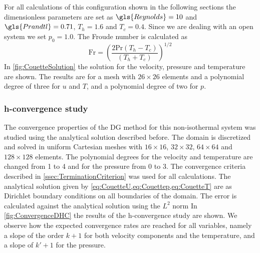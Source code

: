 \FloatBarrier
For all calculations of this configuration shown in the following sections the dimensionless parameters are set as $\gls{Reynolds} = 10$ and $\gls{Prandtl} =0.71$, $T_h = 1.6$ and $T_c = 0.4$. Since we are dealing with an open system we set $p_0 =1.0$. The Froude number is calculated as 
\begin{equation}
\text{Fr} = \left( \frac{2\text{Pr}(T_h-T_c)}{(T_h+T_c)}\right)^{1/2}
\end{equation}
In \cref{fig:CouetteSolution} the solution for the velocity, pressure and temperature are shown. The results are for a mesh with $26\times26$ elements and a polynomial degree of three for $u$ and $T$, and a polynomial degree of two for $p$.


\subsubsection{h-convergence study}

The convergence properties of the DG method for this non-isothermal system was studied using the analytical solution described before. The domain is discretized and solved in uniform Cartesian meshes with $16\times16$, $32\times32$, $64\times64$ and $128\times128$ elements. The polynomial degrees for the velocity and temperature are changed from 1 to 4 and for the pressure from 0 to 3. The convergence criteria described in \cref{ssec:TerminationCriterion} was used for all calculations. The  analytical solution given by \cref{eq:CouetteU,eq:Couettep,eq:CouetteT} are as Dirichlet boundary conditions on all boundaries of the domain. The error is calculated against the analytical solution using the $L^2$ norm %
In \cref{fig:ConvergenceDHC} the results of the h-convergence study are shown. We observe how the expected convergence rates are reached for all variables, namely a slope of the order $k+1$ for both velocity components and the temperature, and a slope of $k'+1$ for the pressure.

%

